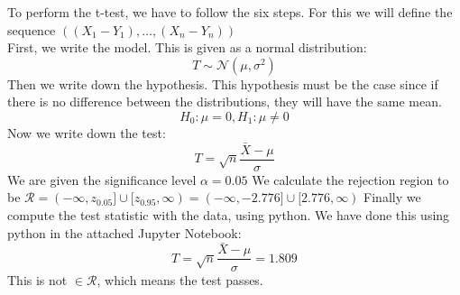 To perform the t-test, we have to follow the six steps. For this we will define the sequence $((X_1 - Y_1), \dotsc , (X_n - Y_n))$\\
First, we write the model. This is given as a normal distribution:
$$
T  \sim \mathcal{N} (\mu,\sigma^2)
$$
Then we write down the hypothesis. This hypothesis must be the case since if there is no difference between the distributions, they will have the same mean.
$$
H_0 : \mu = 0, H_1 : \mu \neq 0
$$
Now we write down the test:
$$
T = \sqrt{n}\frac{\bar X - \mu}{\sigma}
$$
We are given the significance level $\alpha = 0.05$
We calculate the rejection region to be $\mathcal{R} = (-\infty,z_{0.05}]\cup [z_{0.95}, \infty) = (-\infty,-2.776]\cup [2.776, \infty)$
Finally we compute the test statistic with the data, using python. We have done this using python in the attached Jupyter Notebook:
$$
T = \sqrt{n}\frac{\bar X - \mu}{\sigma} = 1.809
$$
This is not $\in \mathcal{R}$, which means the test passes.
